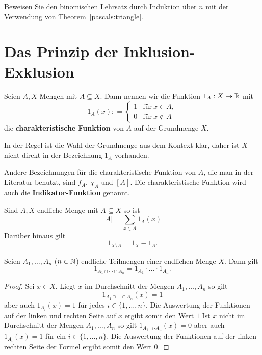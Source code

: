\begin{aufg}
	Beweisen Sie den binomischen Lehrsatz durch Induktion über $n$ mit der Verwendung von Theorem~\ref{pascals:triangle}. 
\end{aufg} 

\section{Das Prinzip der Inklusion-Exklusion} 

\begin{defn}
	Seien $A,X$ Mengen mit $A \subseteq X$. Dann nennen wir die Funktion $1_A : X \to \mathbb{R}$ mit 
	\[
		1_A(x): = \begin{cases}
				1 &  \text{für} \ x \in A, 
			\\	0 & \text{für} \ x \not\in A
			\end{cases} 
	\]
	die \textbf{charakteristische Funktion} von $A$ auf der Grundmenge $X$. 
	
	In der Regel ist die Wahl der Grundmenge aus dem Kontext klar, daher ist $X$ nicht direkt in der Bezeichnung $1_A$ vorhanden.
\end{defn} 

\begin{bem}
	Andere Bezeichnungen für die charakteristische Funktion von $A$, die man in der Literatur benutzt, sind $f_A$, $\chi_A$ und $[A]$. Die charakteristische Funktion wird auch die \textbf{Indikator-Funktion} genannt. 
\end{bem} 

\begin{bem}
	Sind $A, X$ endliche Menge mit $A \subseteq X$ so ist 
	\[	
			|A| = \sum_{x \in A} 1_A(x)
	\] 
	Darüber hinaus gilt 
	\[	
		1_{X \setminus A} = 1_X - 1_A. 
	\]
\end{bem}

\begin{lem}
	Seien $A_1,\ldots,A_n$ ($n \in \mathbb{N}$) endliche Teilmengen einer endlichen Menge $X$. Dann gilt 
	\[
			1_{A_1 \cap \cdots \cap A_n}  = 1_{A_1} \cdot \ldots \cdot 1_{A_n}. 
	\]
\end{lem} 
\begin{proof}
	Sei $x \in X$. 
	Liegt $x$ im Durchschnitt der Mengen $A_1,\ldots,A_n$ so gilt 
	\[ 1_{A_1 \cap \cdots \cap A_n} (x) =1
	\]  aber auch $1_{A_i}(x)=1$ für jedes $i \in \{1,\ldots,n\}$. Die Auswertung der Funktionen auf der linken und rechten Seite auf $x$  ergibt somit den Wert $1$
	Ist $x$ nicht im Durchschnitt der Mengen $A_1,\ldots,A_n$ so gilt $1_{A_1 \cap \cdot A_n}(x) =0$ aber auch $1_{A_i}(x)=1$ für ein $i \in \{1,\ldots,n\}$. Die Auswertung der Funktionen auf der linken rechten Seite der Formel ergibt somit den Wert $0$. 
\end{proof} 

